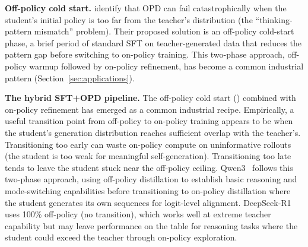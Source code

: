 \documentclass{article} %
\begin{document}
\textbf{Off-policy cold start.} \citet{2604.13016} identify that OPD can fail catastrophically when the student's initial policy is too far from the teacher's distribution (the ``thinking-pattern mismatch'' problem). Their proposed solution is an off-policy cold-start phase, a brief period of standard SFT on teacher-generated data that reduces the pattern gap before switching to on-policy training. This two-phase approach, off-policy warmup followed by on-policy refinement, has become a common industrial pattern (Section~\ref{sec:applications}).

\textbf{The hybrid SFT+OPD pipeline.} The off-policy cold start (\citet{2604.13016}) combined with on-policy refinement has emerged as a common industrial recipe. Empirically, a useful transition point from off-policy to on-policy training appears to be when the student's generation distribution reaches sufficient overlap with the teacher's. Transitioning too early can waste on-policy compute on uninformative rollouts (the student is too weak for meaningful self-generation). Transitioning too late tends to leave the student stuck near the off-policy ceiling. Qwen3~\citep{2505.09388} follows this two-phase approach, using off-policy distillation to establish basic reasoning and mode-switching capabilities before transitioning to on-policy distillation where the student generates its own sequences for logit-level alignment. DeepSeek-R1~\citep{2501.12948} uses 100\% off-policy (no transition), which works well at extreme teacher capability but may leave performance on the table for reasoning tasks where the student could exceed the teacher through on-policy exploration.
\end{document}
